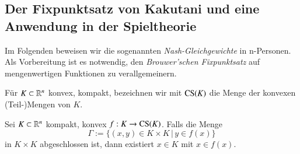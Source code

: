 \subsection{Der Fixpunktsatz von Kakutani und eine Anwendung in der Spieltheorie}

Im Folgenden beweisen wir die sogenannten \textit{Nash-Gleichgewichte} in n-Personen.
Als Vorbereitung ist es notwendig, den \textit{Brouwer'schen Fixpunktsatz} auf mengenwertigen Funktionen
zu verallgemeinern.

Für $K\subset \mathbb{R}^n$ konvex, kompakt, bezeichnen wir mit $\mathrm{CS}(K)$ die Menge der konvexen (Teil-)Mengen
von $K$.

\begin{theorem}[Kakutani]\label{2.16}
    Sei $K\subset \mathbb{R}^n$ kompakt, konvex $f:K\rightarrow \mathrm{CS}(K)$. Falls die Menge
    \[
        \Gamma := \{(x,y)\in K\times K\, |\, y\in f(x)\}
    \]
    in $K\times K$ abgeschlossen ist, dann existiert $x\in K$ mit $x\in f(x)$.
\end{theorem}

